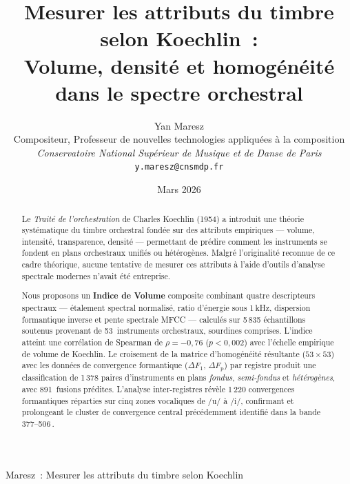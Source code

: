 \documentclass[journal]{IEEEtran}
\newcommand{\Fp}{F_\mathrm{p}}
\newcommand{\Hz}{\,\text{Hz}}
\begin{document}
\title{Mesurer les attributs du timbre selon Koechlin~:\\Volume, densité et homogénéité\\dans le spectre orchestral}

\author{%
  Yan Maresz\\
  Compositeur, Professeur de nouvelles technologies appliquées à la composition\\
  \textit{Conservatoire National Supérieur de Musique et de Danse de Paris}\\
  \texttt{y.maresz@cnsmdp.fr}%
}
\date{Mars 2026}

%
{Maresz~: Mesurer les attributs du timbre selon Koechlin}

\maketitle

\begin{abstract}
Le \textit{Traité de l'orchestration} de Charles Koechlin (1954) a introduit une théorie systématique du timbre orchestral fondée sur des attributs empiriques --- volume, intensité, transparence, densité --- permettant de prédire comment les instruments se fondent en plans orchestraux unifiés ou hétérogènes. Malgré l'originalité reconnue de ce cadre théorique, aucune tentative de mesurer ces attributs à l'aide d'outils d'analyse spectrale modernes n'avait été entreprise.

Nous proposons un \textbf{Indice de Volume} composite combinant quatre descripteurs spectraux --- étalement spectral normalisé, ratio d'énergie sous 1\,kHz, dispersion formantique inverse et pente spectrale MFCC --- calculés sur 5\,835 échantillons soutenus provenant de 53~instruments orchestraux, sourdines comprises. L'indice atteint une corrélation de Spearman de $\rho = -0{,}76$ ($p < 0{,}002$) avec l'échelle empirique de volume de Koechlin. Le croisement de la matrice d'homogénéité résultante ($53 \times 53$) avec les données de convergence formantique ($\Delta F_1$, $\Delta\Fp$) par registre produit une classification de 1\,378 paires d'instruments en plans \textit{fondus}, \textit{semi-fondus} et \textit{hétérogènes}, avec 891~fusions prédites. L'analyse inter-registres révèle 1\,220 convergences formantiques réparties sur cinq zones vocaliques de /u/ à /i/, confirmant et prolongeant le cluster de convergence central précédemment identifié dans la bande 377--506\Hz.
\end{abstract}
\end{document}
